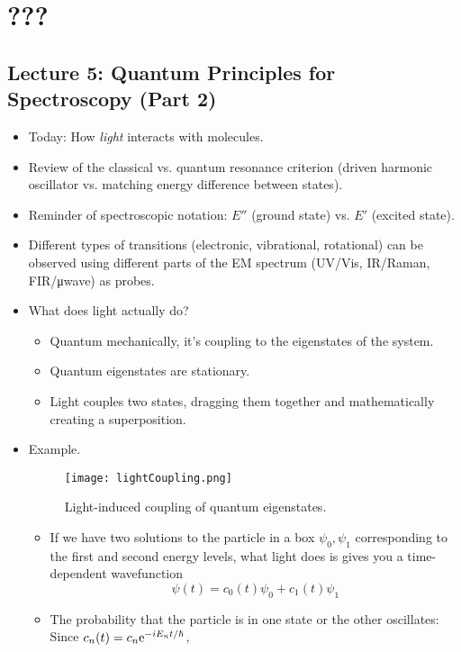 \documentclass[../notes.tex]{subfiles}
\begin{document}
\chapter{???}
\section{Lecture 5: Quantum Principles for Spectroscopy (Part 2)}
\begin{itemize}
    \item {}Today: How \emph{light} interacts with molecules.
    \item Review of the classical vs. quantum resonance criterion (driven harmonic oscillator vs. matching energy difference between states).
    \item Reminder of spectroscopic notation: $E''$ (ground state) vs. $E'$ (excited state).
    \item Different types of transitions (electronic, vibrational, rotational) can be observed using different parts of the EM spectrum (UV/Vis, IR/Raman, FIR/\si{\micro wave}) as probes.
    \item What does light actually do?
    \begin{itemize}
        \item Quantum mechanically, it's coupling to the eigenstates of the system.
        \item Quantum eigenstates are stationary.
        \item Light couples two states, dragging them together and mathematically creating a superposition.
    \end{itemize}
    \item Example.
    \begin{figure}[h!]
        \centering
        \texttt{[image: lightCoupling.png]}
        \caption{Light-induced coupling of quantum eigenstates.}
        \label{fig:lightCoupling}
    \end{figure}
    \begin{itemize}
        \item If we have two solutions to the particle in a box $\psi_0,\psi_1$ corresponding to the first and second energy levels, what light does is gives you a time-dependent wavefunction
        \begin{equation*}
            \psi(t) = c_0(t)\psi_0+c_1(t)\psi_1
        \end{equation*}
        \item The probability that the particle is in one state or the other oscillates: Since $c_n(t)=c_n\e[-iE_nt/\hbar]$,

\end{itemize}
\end{itemize}
\end{document}
